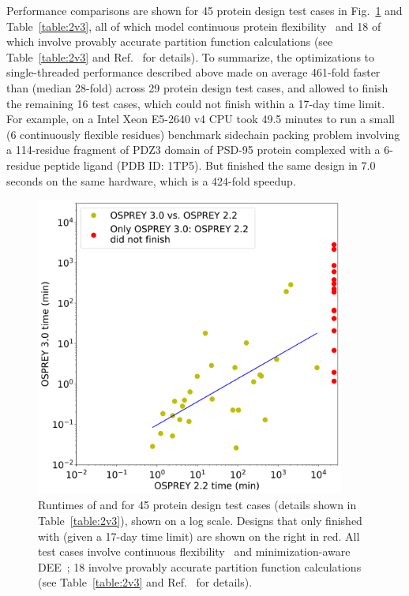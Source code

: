 Performance comparisons are shown for 45 protein design test cases in Fig.~\ref{fig:2v3} and Table~\ref{table:2v3}, all of which model continuous protein flexibility~\cite{minDEE,iMinDEE,EPIC} and 18 of which involve provably accurate partition function calculations (see Table~\ref{table:2v3} and Ref.~\cite{EPIC} for details).  To summarize, the optimizations to single-threaded performance described above made  on average 461-fold faster than  (median 28-fold) across 29 protein design test cases, and allowed  to finish the remaining 16 test cases, which  could not finish within a 17-day time limit.  For example,  on a Intel Xeon E5-2640 v4 CPU took 49.5 minutes to run a small (6 continuously flexible residues) benchmark sidechain packing problem involving a 114-residue fragment of PDZ3 domain of PSD-95 protein complexed with a 6-residue peptide ligand (PDB ID: 1TP5).  But  finished the same design in 7.0 seconds on the same hardware, which is a 424-fold speedup.  

\begin{figure}
\center
\includegraphics[width=4in]{figures/2v3_times.png}
\caption{Runtimes of  and  for 45 protein design test cases (details shown in Table~\ref{table:2v3}), shown on a log scale. Designs that only finished with  (given a 17-day time limit) are shown on the right in red.  All test cases involve continuous flexibility~\cite{minDEE,iMinDEE} and minimization-aware DEE~\cite{iMinDEE,EPIC}; 18 involve provably accurate partition function calculations (see Table~\ref{table:2v3} and Ref.~\cite{EPIC} for details).  }
\label{fig:2v3}
\end{figure}

